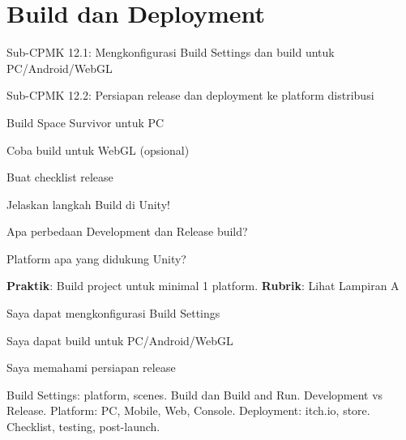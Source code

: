 \documentclass[../main]{subfiles}
\begin{document}
\chapter{Build dan Deployment}

\begin{subcpmk}
  \item Sub-CPMK 12.1: Mengkonfigurasi Build Settings dan build untuk PC/Android/WebGL
  \item Sub-CPMK 12.2: Persiapan release dan deployment ke platform distribusi
\end{subcpmk}






\begin{aktivitas}
  \item Build Space Survivor untuk PC
  \item Coba build untuk WebGL (opsional)
  \item Buat checklist release
\end{aktivitas}

\begin{latihan}
  \item Jelaskan langkah Build di Unity!
  \item Apa perbedaan Development dan Release build?
  \item Platform apa yang didukung Unity?
\end{latihan}

\begin{asesmen}
\textbf{Praktik}: Build project untuk minimal 1 platform.
\textbf{Rubrik}: Lihat Lampiran A
\end{asesmen}

\begin{checklist}
  \item Saya dapat mengkonfigurasi Build Settings
  \item Saya dapat build untuk PC/Android/WebGL
  \item Saya memahami persiapan release
\end{checklist}

\begin{rangkuman}
Build Settings: platform, scenes. Build dan Build and Run. Development vs Release. Platform: PC, Mobile, Web, Console. Deployment: itch.io, store. Checklist, testing, post-launch.
\end{rangkuman}

\ifSubfilesClassLoaded{
  \renewcommand{\bibname}{Daftar Pustaka}
  
  
}{}
\end{document}
